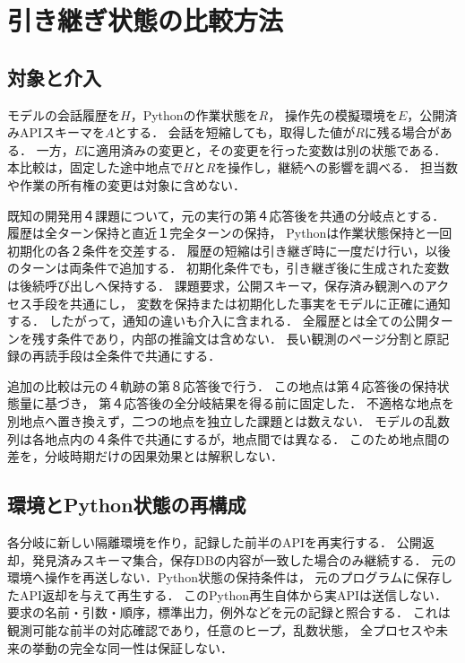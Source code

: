 \section{引き継ぎ状態の比較方法}
\subsection{対象と介入}
モデルの会話履歴を$H$，Pythonの作業状態を$R$，
操作先の模擬環境を$E$，公開済みAPIスキーマを$A$とする．
会話を短縮しても，取得した値が$R$に残る場合がある．
一方，$E$に適用済みの変更と，その変更を行った変数は別の状態である．
本比較は，固定した途中地点で$H$と$R$を操作し，継続への影響を調べる．
担当数や作業の所有権の変更は対象に含めない．

既知の開発用４課題について，元の実行の第４応答後を共通の分岐点とする．
履歴は全ターン保持と直近１完全ターンの保持，
Pythonは作業状態保持と一回初期化の各２条件を交差する．
履歴の短縮は引き継ぎ時に一度だけ行い，以後のターンは両条件で追加する．
初期化条件でも，引き継ぎ後に生成された変数は後続呼び出しへ保持する．
課題要求，公開スキーマ，保存済み観測へのアクセス手段を共通にし，
変数を保持または初期化した事実をモデルに正確に通知する．
したがって，通知の違いも介入に含まれる．
全履歴とは全ての公開ターンを残す条件であり，内部の推論文は含めない．
長い観測のページ分割と原記録の再読手段は全条件で共通にする．

追加の比較は元の４軌跡の第８応答後で行う．
この地点は第４応答後の保持状態量に基づき，
第４応答後の全分岐結果を得る前に固定した．
不適格な地点を別地点へ置き換えず，二つの地点を独立した課題とは数えない．
モデルの乱数列は各地点内の４条件で共通にするが，地点間では異なる．
このため地点間の差を，分岐時期だけの因果効果とは解釈しない．

\subsection{環境とPython状態の再構成}
各分岐に新しい隔離環境を作り，記録した前半のAPIを再実行する．
公開返却，発見済みスキーマ集合，保存DBの内容が一致した場合のみ継続する．
元の環境へ操作を再送しない．Python状態の保持条件は，
元のプログラムに保存したAPI返却を与えて再生する．
このPython再生自体から実APIは送信しない．
要求の名前・引数・順序，標準出力，例外などを元の記録と照合する．
これは観測可能な前半の対応確認であり，任意のヒープ，乱数状態，
全プロセスや未来の挙動の完全な同一性は保証しない．

